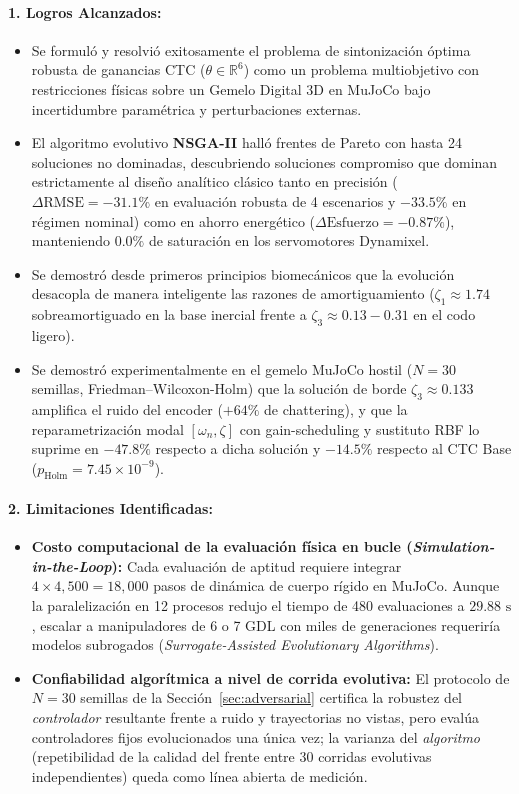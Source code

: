 \documentclass[11pt,a4paper]{article}
\begin{document}
\paragraph{1. Logros Alcanzados:}
\begin{itemize}
    \item Se formuló y resolvió exitosamente el problema de sintonización óptima robusta de ganancias CTC ($\theta \in \mathbb{R}^6$) como un problema multiobjetivo con restricciones físicas sobre un Gemelo Digital 3D en MuJoCo bajo incertidumbre paramétrica y perturbaciones externas.
    \item El algoritmo evolutivo \textbf{NSGA-II} halló frentes de Pareto con hasta 24 soluciones no dominadas, descubriendo soluciones compromiso que dominan estrictamente al diseño analítico clásico tanto en precisión ($\Delta\text{RMSE} = -31.1\%$ en evaluación robusta de 4 escenarios y $-33.5\%$ en régimen nominal) como en ahorro energético ($\Delta\text{Esfuerzo} = -0.87\%$), manteniendo $0.0\%$ de saturación en los servomotores Dynamixel.
    \item Se demostró desde primeros principios biomecánicos que la evolución desacopla de manera inteligente las razones de amortiguamiento ($\zeta_1 \approx 1.74$ sobreamortiguado en la base inercial frente a $\zeta_3 \approx 0.13-0.31$ en el codo ligero).
    \item Se demostró experimentalmente en el gemelo MuJoCo hostil ($N=30$ semillas, Friedman--Wilcoxon-Holm) que la solución de borde $\zeta_3 \approx 0.133$ amplifica el ruido del encoder ($+64\%$ de chattering), y que la reparametrización modal $[\omega_n, \zeta]$ con gain-scheduling y sustituto RBF lo suprime en $-47.8\%$ respecto a dicha solución y $-14.5\%$ respecto al CTC Base ($p_{\text{Holm}}=7.45\times10^{-9}$).
\end{itemize}

\paragraph{2. Limitaciones Identificadas:}
\begin{itemize}
    \item \textbf{Costo computacional de la evaluación física en bucle (\textit{Simulation-in-the-Loop}):} Cada evaluación de aptitud requiere integrar $4 \times 4,500 = 18,000$ pasos de dinámica de cuerpo rígido en MuJoCo. Aunque la paralelización en 12 procesos redujo el tiempo de 480 evaluaciones a $29.88\text{ s}$, escalar a manipuladores de 6 o 7 GDL con miles de generaciones requeriría modelos subrogados (\textit{Surrogate-Assisted Evolutionary Algorithms}).
    \item \textbf{Confiabilidad algorítmica a nivel de corrida evolutiva:} El protocolo de $N=30$ semillas de la Sección~\ref{sec:adversarial} certifica la robustez del \emph{controlador} resultante frente a ruido y trayectorias no vistas, pero evalúa controladores fijos evolucionados una única vez; la varianza del \emph{algoritmo} (repetibilidad de la calidad del frente entre 30 corridas evolutivas independientes) queda como línea abierta de medición.
\end{itemize}
\end{document}
